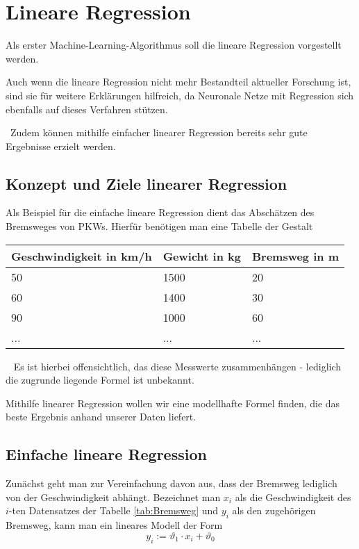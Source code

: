 \section{Lineare Regression}
\label{sec:LineareRegression}
Als erster Machine-Learning-Algorithmus soll die lineare Regression vorgestellt werden. 

Auch wenn die lineare Regression nicht mehr Bestandteil aktueller Forschung ist, sind sie für weitere Erklärungen hilfreich, da Neuronale Netze mit Regression sich ebenfalls auf dieses Verfahren stützen. 

~\newline Zudem können mithilfe einfacher linearer Regression bereits sehr gute Ergebnisse erzielt werden.
\subsection{Konzept und Ziele linearer Regression}
Als Beispiel für die einfache lineare Regression dient das Abschätzen des Bremsweges von PKWs. Hierfür benötigen man eine Tabelle der Gestalt

\begin{center}
	\label{tab:Bremsweg}
	\begin{tabular}{|p{}|p{}|p{}|}
		\hline
		Geschwindigkeit in km/h & Gewicht in kg & Bremsweg in m  \\ \hline
		50& 1500 & 20 \\ \hline
		60& 1400 & 30 \\ \hline
		90& 1000 & 60 \\ \hline
		...& ... & ... \\ \hline
	\end{tabular}
\end{center}
~\newline
Es ist hierbei offensichtlich, das diese Messwerte zusammenhängen - lediglich die zugrunde liegende Formel ist unbekannt. 

Mithilfe linearer Regression wollen wir eine modellhafte Formel finden, die das beste Ergebnis anhand unserer Daten liefert.
\subsection{Einfache lineare Regression}
Zunächst geht man zur Vereinfachung davon aus, dass der Bremsweg lediglich von der Geschwindigkeit abhängt. Bezeichnet man $x_i$ als die Geschwindigkeit des $i$-ten Datensatzes der Tabelle \ref{tab:Bremsweg} und $y_i$ als den zugehörigen Bremsweg, kann man ein lineares Modell der Form 
\begin{equation}
	y_i := \vartheta_1 \cdot x_i + \vartheta_0 
\end{equation}

